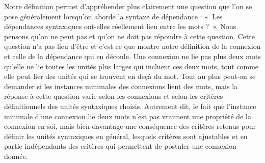 Notre définition permet d’appréhender plus clairement une question que l’on se pose généralement lorsqu’on aborde la syntaxe de dépendance : «~Les dépendances syntaxiques ont-elles réellement lieu entre les mots ?~». Nous pensons qu’on ne peut pas et qu’on ne doit pas répondre à cette question. Cette question n’a pas lieu d’être et c’est ce que montre notre définition de la connexion et celle de la dépendance qui en découle. Une connexion ne lie pas plus deux mots qu’elle ne lie toutes les unités plus larges qui incluent ces deux mots, tout comme elle peut lier des unités qui se trouvent en deçà du mot. Tout au plus peut-on se demander si les instances minimales des connexions lient des mots, mais la réponse à cette question varie selon les connexions et selon les critères définitionnels des unités syntaxiques choisis. Autrement dit, le fait que l’instance minimale d’une connexion lie deux mots n’est pas vraiment une propriété de la connexion en soi, mais bien davantage une conséquence des critères retenus pour définir les unités syntaxiques en général, lesquels critères sont ajustables et en partie indépendants des critères qui permettent de postuler une connexion donnée.


